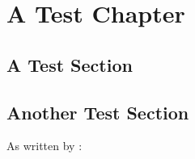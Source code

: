 \newcommand{\thetitle}{The Great Project\\ And How to Typeset it}
\newcommand{\thegroup}{Group XXXX}
\newcommand{\theauthors}{
	Anders Andersen\\
	Anders Andersen\\
	Anders Andersen\\
	Anders Andersen
}
\newcommand{\thesupervisor}{Your Supervisor}
\newcommand{\thestudy}{Your Study}
\newcommand{\thetheme}{Your Theme}
\newcommand{\theprojectperiod}{Spring / Summer}
\newcommand{\deadline}{\today}





\chapter{A Test Chapter}
\lipsum[1]

\section{A Test Section}
\lipsum[2] \autocite{goossens93}

\lipsum[3]

\section{Another Test Section}
\lipsum[4]

As written by \textcite{greenwade93}:
\lipsum[5] 

\printbibliography[
	heading=bibintoc         %
	,title={Litteraturliste}%
]
